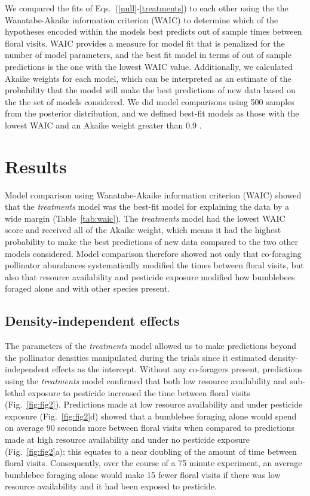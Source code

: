 \begin{refsection}
We compared the fits of  Eqs.~(\ref{null}-\ref{treatments}) to each other using the the Wanatabe-Akaike information criterion (WAIC) to determine which of the hypotheses encoded within the models best predicts out of sample times between floral visits. WAIC provides a measure for model fit that is penalized for the number of model parameters, and the best fit model in terms of out of sample predictions is the one with the lowest WAIC value. Additionally, we calculated Akaike weights for each model, which can be  interpreted as an estimate of the probability that the model will make the best predictions of new data based on the the set of models considered. We did model comparisons using 500 samples from the posterior distribution, and we defined best-fit models as those with the lowest WAIC and an Akaike weight greater than 0.9 \citep{mcelreath_statistical_2018}.

\section*{Results}

Model comparison using Wanatabe-Akaike information criterion (WAIC) showed that the \textit{treatments} model was the best-fit model for explaining the data by a wide margin (Table~\ref{tab:waic}). The \textit{treatments} model had the lowest WAIC score and received all of the Akaike weight, which means it had the highest probability to make the best predictions of new data compared to the two other models considered. Model comparison therefore showed not only that co-foraging pollinator abundances systematically modified the times between floral visits, but also that resource availability and pesticide exposure modified how bumblebees foraged alone and with other species present.

\subsection*{Density-independent effects}

The parameters of the \textit{treatments} model allowed us to make predictions beyond the pollinator densities manipulated during the trials since it estimated density-independent effects as the intercept. Without any co-foragers present, predictions using the \textit{treatments} model confirmed that both low resource availability and sub-lethal exposure to pesticide increased the time between floral visits (Fig.~\ref{fig:fig2}). Predictions made at low resource availability and under pesticide exposure (Fig.~\ref{fig:fig2}d) showed that a bumblebee foraging alone would spend on average 90 seconds more between floral visits when compared to predictions made at high resource availability and under no pesticide exposure (Fig.~\ref{fig:fig2}a); this equates to a near doubling of the amount of time between floral visits. Consequently, over the course of a 75 minute experiment, an average bumblebee foraging alone would make 15 fewer floral visits if there was low resource availability and it had been exposed to pesticide.


\end{refsection}
